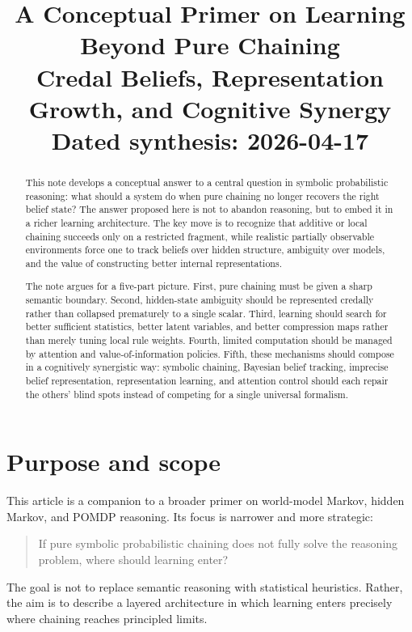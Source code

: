 \documentclass[11pt]{article}
\title{A Conceptual Primer on Learning Beyond Pure Chaining\\\large Credal Beliefs, Representation Growth, and Cognitive Synergy\\\large Dated synthesis: 2026-04-17}
\author{}
\date{}
\begin{document}
\maketitle

\begin{abstract}
This note develops a conceptual answer to a central question in symbolic
probabilistic reasoning: what should a system do when pure chaining no longer
recovers the right belief state?  The answer proposed here is not to abandon
reasoning, but to embed it in a richer learning architecture.  The key move is
to recognize that additive or local chaining succeeds only on a restricted
fragment, while realistic partially observable environments force one to track
beliefs over hidden structure, ambiguity over models, and the value of
constructing better internal representations.

The note argues for a five-part picture.  First, pure chaining must be given a
sharp semantic boundary.  Second, hidden-state ambiguity should be represented
credally rather than collapsed prematurely to a single scalar.  Third, learning
should search for better sufficient statistics, better latent variables, and
better compression maps rather than merely tuning local rule weights.  Fourth,
limited computation should be managed by attention and value-of-information
policies.  Fifth, these mechanisms should compose in a cognitively synergistic
way: symbolic chaining, Bayesian belief tracking, imprecise belief
representation, representation learning, and attention control should each
repair the others' blind spots instead of competing for a single universal
formalism.
\end{abstract}

\tableofcontents

\section{Purpose and scope}

This article is a companion to a broader primer on world-model Markov, hidden
Markov, and POMDP reasoning.  Its focus is narrower and more strategic:
\begin{quote}
If pure symbolic probabilistic chaining does not fully solve the reasoning
problem, where should learning enter?
\end{quote}

The goal is not to replace semantic reasoning with statistical heuristics.
Rather, the aim is to describe a layered architecture in which learning enters
precisely where chaining reaches principled limits.
\end{document}
